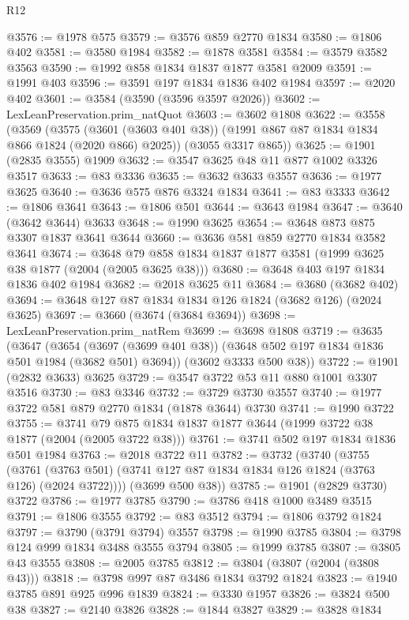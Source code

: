 \begin{lexlean}{R12}
\begin{coremodule}
@3576 := @1978 @575
@3579 := @3576 @859 @2770 @1834
@3580 := @1806 @402
@3581 := @3580 @1984
@3582 := @1878 @3581
@3584 := @3579 @3582 @3563
@3590 := @1992 @858 @1834 @1837 @1877 @3581 @2009
@3591 := @1991 @403
@3596 := @3591 @197 @1834 @1836 @402 @1984
@3597 := @2020 @402
@3601 := @3584 (@3590 (@3596 @3597 @2026))
@3602 := LexLeanPreservation.prim_natQuot
@3603 := @3602 @1808
@3622 := @3558
    (@3569
      (@3575 (@3601 (@3603 @401 @38)) (@1991 @867 @87 @1834 @1834 @866 @1824 (@2020 @866) @2025))
      (@3055 @3317 @865))
@3625 := @1901 (@2835 @3555) @1909
@3632 := @3547 @3625 @48 @11 @877 @1002 @3326 @3517
@3633 := @83 @3336
@3635 := @3632 @3633 @3557
@3636 := @1977 @3625
@3640 := @3636 @575 @876 @3324 @1834
@3641 := @83 @3333
@3642 := @1806 @3641
@3643 := @1806 @501
@3644 := @3643 @1984
@3647 := @3640 (@3642 @3644) @3633
@3648 := @1990 @3625
@3654 := @3648 @873 @875 @3307 @1837 @3641 @3644
@3660 := @3636 @581 @859 @2770 @1834 @3582 @3641
@3674 := @3648 @79 @858 @1834 @1837 @1877 @3581 (@1999 @3625 @38 @1877 (@2004 (@2005 @3625 @38)))
@3680 := @3648 @403 @197 @1834 @1836 @402 @1984
@3682 := @2018 @3625 @11
@3684 := @3680 (@3682 @402)
@3694 := @3648 @127 @87 @1834 @1834 @126 @1824 (@3682 @126) (@2024 @3625)
@3697 := @3660 (@3674 (@3684 @3694))
@3698 := LexLeanPreservation.prim_natRem
@3699 := @3698 @1808
@3719 := @3635
    (@3647
      (@3654 (@3697 (@3699 @401 @38)) (@3648 @502 @197 @1834 @1836 @501 @1984 (@3682 @501) @3694))
      (@3602 @3333 @500 @38))
@3722 := @1901 (@2832 @3633) @3625
@3729 := @3547 @3722 @53 @11 @880 @1001 @3307 @3516
@3730 := @83 @3346
@3732 := @3729 @3730 @3557
@3740 := @1977 @3722 @581 @879 @2770 @1834 (@1878 @3644) @3730
@3741 := @1990 @3722
@3755 := @3741 @79 @875 @1834 @1837 @1877 @3644 (@1999 @3722 @38 @1877 (@2004 (@2005 @3722 @38)))
@3761 := @3741 @502 @197 @1834 @1836 @501 @1984
@3763 := @2018 @3722 @11
@3782 := @3732
    (@3740
      (@3755
        (@3761 (@3763 @501) (@3741 @127 @87 @1834 @1834 @126 @1824 (@3763 @126) (@2024 @3722))))
      (@3699 @500 @38))
@3785 := @1901 (@2829 @3730) @3722
@3786 := @1977 @3785
@3790 := @3786 @418 @1000 @3489 @3515
@3791 := @1806 @3555
@3792 := @83 @3512
@3794 := @1806 @3792 @1824
@3797 := @3790 (@3791 @3794) @3557
@3798 := @1990 @3785
@3804 := @3798 @124 @999 @1834 @3488 @3555 @3794
@3805 := @1999 @3785
@3807 := @3805 @43 @3555
@3808 := @2005 @3785
@3812 := @3804 (@3807 (@2004 (@3808 @43)))
@3818 := @3798 @997 @87 @3486 @1834 @3792 @1824
@3823 := @1940 @3785 @891 @925 @996 @1839
@3824 := @3330 @1957
@3826 := @3824 @500 @38
@3827 := @2140 @3826
@3828 := @1844 @3827
@3829 := @3828 @1834

\end{coremodule}
\end{lexlean}
